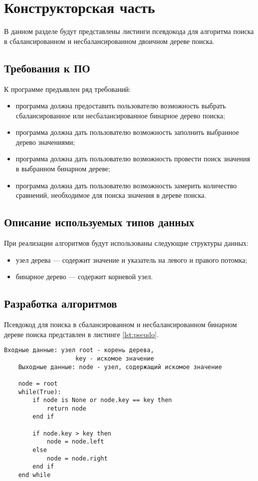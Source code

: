 \chapter{Конструкторская часть}

В данном разделе будут представлены листинги псевдокода для алгоритма поиска в сбалансированном и несбалансированном двоичном дереве поиска.

\section{Требования к ПО}

К программе предъявлен ряд требований:

\begin{itemize}[label=---]
	\item программа должна предоставить пользователю возможность выбрать сбалансированное или несбалансированное бинарное дерево поиска;
	\item программа должна дать пользователю возможность заполнить выбранное дерево значениями;
	\item программа должна дать пользователю возможность провести поиск значения в выбранном бинарном дереве;
	\item программа должна дать пользователю возможность замерить количество сравнений, необходимое для поиска значения в дереве поиска.
\end{itemize}

\section{Описание используемых типов данных}
При реализации алгоритмов будут использованы следующие структуры данных:
\begin{itemize}[label=---]
	\item узел дерева --- содержит значение и указатель на левого и правого потомка;
	\item бинарное дерево --- содержит корневой узел.
\end{itemize}

\section{Разработка алгоритмов}

Псевдокод для поиска в сбалансированном и несбалансированном бинарном дереве поиска представлен в листинге \ref{lst:pseudo}.
\begin{lstlisting}[label=lst:pseudo,caption=Псевдокод для поиска в бинарном дереве поиска]
	Входные данные: узел root - корень дерева,
					key - искомое значение
	Выходные данные: node - узел, содержащий искомое значение

	node = root
	while(True):
		if node is None or node.key == key then
			return node
		end if

		if node.key > key then
			node = node.left
		else
			node = node.right
		end if
	end while
	\end{lstlisting}


